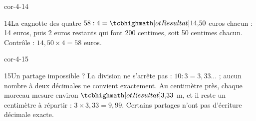 \begin{blocLivre}{cor-4-14}\begin{corrige}{14}{La cagnotte des quatre}
$58:4=\res{14{,}50}$ euros chacun : 14 euros, puis 2 euros restants qui font 200 centimes, soit 50 centimes chacun. Contrôle : $14{,}50\times4=58$ euros.
\end{corrige}\end{blocLivre}
\begin{blocLivre}{cor-4-15}\begin{corrige}{15}{Un partage impossible ?}
La division ne s’arrête pas : $10:3=3{,}33\ldots$ ; aucun nombre à deux décimales ne convient exactement. Au centimètre près, chaque morceau mesure environ $\res{3{,}33}$ m, et il reste un centimètre à répartir : $3\times3{,}33=9{,}99$. Certains partages n’ont pas d’écriture décimale exacte.
\end{corrige}\end{blocLivre}
